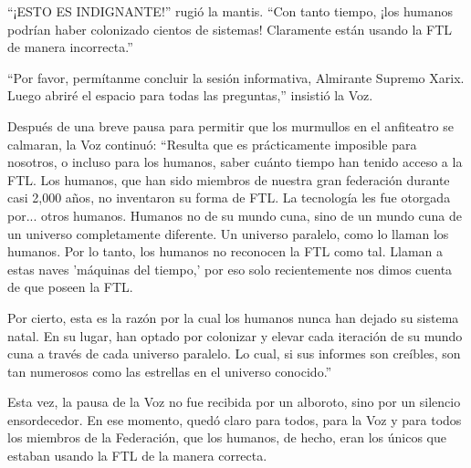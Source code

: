 \documentclass[spanish,12pt,a4paper,twoside,titlepage]{book}
\begin{document}
    ``¡ESTO ES INDIGNANTE!'' rugió la mantis. ``Con tanto tiempo, ¡los humanos podrían haber colonizado cientos de sistemas! Claramente están usando la FTL de manera incorrecta.''

    ``Por favor, permítanme concluir la sesión informativa, Almirante Supremo Xarix. Luego abriré el espacio para todas las preguntas,'' insistió la Voz.

    Después de una breve pausa para permitir que los murmullos en el anfiteatro se calmaran, la Voz continuó: ``Resulta que es prácticamente imposible para nosotros, o incluso para los humanos, saber cuánto tiempo han tenido acceso a la FTL. Los humanos, que han sido miembros de nuestra gran federación durante casi 2,000 años, no inventaron su forma de FTL. La tecnología les fue otorgada por... otros humanos. Humanos no de su mundo cuna, sino de un mundo cuna de un universo completamente diferente. Un universo paralelo, como lo llaman los humanos. Por lo tanto, los humanos no reconocen la FTL como tal. Llaman a estas naves 'máquinas del tiempo,' por eso solo recientemente nos dimos cuenta de que poseen la FTL.

    Por cierto, esta es la razón por la cual los humanos nunca han dejado su sistema natal. En su lugar, han optado por colonizar y elevar cada iteración de su mundo cuna a través de cada universo paralelo. Lo cual, si sus informes son creíbles, son tan numerosos como las estrellas en el universo conocido.''

    Esta vez, la pausa de la Voz no fue recibida por un alboroto, sino por un silencio ensordecedor. En ese momento, quedó claro para todos, para la Voz y para todos los miembros de la Federación, que los humanos, de hecho, eran los únicos que estaban usando la FTL de la manera correcta.
\end{document}
